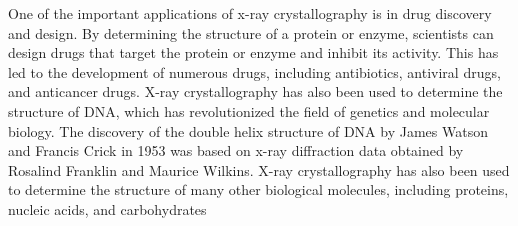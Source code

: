 \documentclass[10pt]{article}
\begin{document}
One of the important applications of x-ray crystallography is in drug discovery and design. By determining the structure of a protein or enzyme, scientists can design drugs that target the protein or enzyme and inhibit its activity. This has led to the development of numerous drugs, including antibiotics, antiviral drugs, and anticancer drugs. X-ray crystallography has also been used to determine the structure of DNA, which has revolutionized the field of genetics and molecular biology. The discovery of the double helix structure of DNA by James Watson and Francis Crick in 1953 was based on x-ray diffraction data obtained by Rosalind Franklin and Maurice Wilkins. X-ray crystallography has also been used to determine the structure of many other biological molecules, including proteins, nucleic acids, and carbohydrates \cite{Bijak_2023}

\printbibliography
\end{document}
